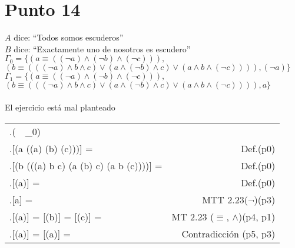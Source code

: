 \documentclass{article}
\newcommand{\q}[1]{``#1''}
\newcommand{\val}[2]{\mathbf{#1}[#2]}
\newlength{\logicv}
\newenvironment{logicenv}[2][0]{
  \begin{tcolorbox}[demo, title = #2]
  \vspace*{#1\logicv}
}{
  \end{tcolorbox}
  \vspace*{-.5cm}
}
\newenvironment{subproofill}[1][0]{
  \begin{tcolorbox}[demo, title = ]
    \vspace*{-#1\logicv}
}{
  \end{tcolorbox}
  \vspace*{-.5cm}
}
\newenvironment{subproof}[2][0]{
  \begin{tcolorbox}[demo, title = #2, colframe = black]
  \vspace*{#1\logicv}
  \begin{logic}
}{
  \end{logic}
  \end{tcolorbox}
}
\newenvironment{logic}{
    \setlength{\extrarowheight}{3pt}
    \setcounter{row}{-1}
    \begin{center}
    \begin{NiceTabular}{>{\stepcounter{row}\therow.\hspace*{5pt}} L r }
}{
    \end{NiceTabular}
    \end{center}
}
\begin{document}
\section{Punto 14}
\begin{logicenv}[5]{Punto 14}
  $A$ dice: \q{Todos somos escuderos}\\
  $B$ dice: \q{Exactamente uno de nosotros es escudero}\\
  $\Gamma_0 = \{(a \equiv ((\neg a) \land (\neg b) \land (\neg c))),$\\
  \hspace*{1cm}$(b \equiv (((\neg a) \land b \land c) \lor (a \land (\neg b) \land c) \lor (a \land b \land (\neg c)))), (\neg a)\}$\\
  $\Gamma_1 = \{(a \equiv ((\neg a) \land (\neg b) \land (\neg c))),$\\
  \hspace*{1cm}$(b \equiv (((\neg a) \land b \land c) \lor (a \land (\neg b) \land c) \lor (a \land b \land (\neg c)))), a\}$\\
  \makebox[10cm]{\hrulefill}\\
  El ejercicio está mal planteado
\end{logicenv}
\begin{subproofill}
  \begin{subproof}[5]{Con $\Gamma_0$}
    (\exists {}\, \vert\,   \Gamma_0)\\
    \val{v}{(a \equiv ((\neg a) \land (\neg b) \land (\neg c)))} =  & Def.(p0)\\
    \val{v}{(b \equiv (((\neg a) \land b \land c) \lor (a \land (\neg b) \land c) \lor (a \land b \land (\neg c))))} =  & Def.(p0)\\
    \val{v}{(\neg a)} =  & Def.(p0)\\
    \val{v}{a} =  & MTT 2.23($\neg$)(p3)\\
    \val{v}{(\neg a)} =   \val{v}{(\neg b)}  =   \val{v}{(\neg c)} =  & MT 2.23 ($\equiv$, $\land$)(p4, p1)\\
    \val{v}{(\neg a)} =   \val{v}{(\neg a)} =  & Contradicción (p5, p3)
  \end{subproof}
\end{subproofill}
\end{document}
